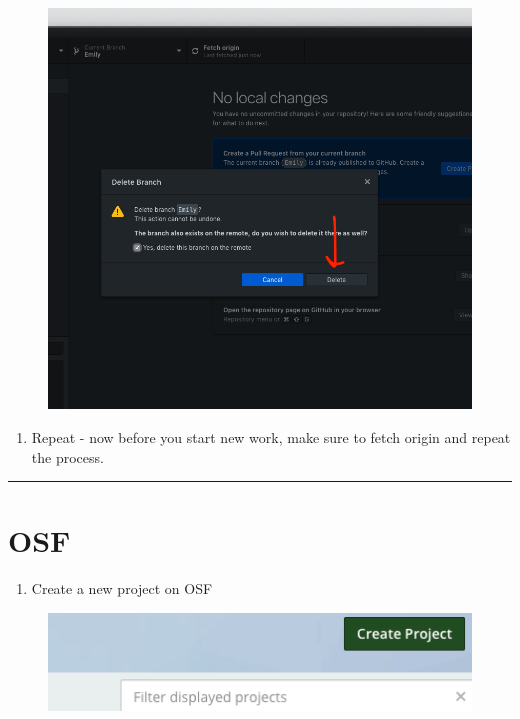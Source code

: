 \documentclass[]{book}
\providecommand{\tightlist}{%
  \setlength{\itemsep}{0pt}\setlength{\parskip}{0pt}}
\begin{document}
\begin{figure}
\centering
\includegraphics{images/research_protocols/github/31.png}
\caption{}
\end{figure}

\begin{enumerate}
\def\labelenumi{\arabic{enumi}.}
\setcounter{enumi}{9}
\tightlist
\item
  Repeat - now before you start new work, make sure to fetch origin and repeat the process.
\end{enumerate}

\begin{center}\rule{0.5\linewidth}{0.5pt}\end{center}

\hypertarget{osf}{%
\section{OSF}\label{osf}}

\begin{enumerate}
\def\labelenumi{\arabic{enumi}.}
\tightlist
\item
  Create a new project on OSF
\end{enumerate}

\begin{figure}
\centering
\includegraphics{images/research_protocols/osf/1.png}
\caption{}
\end{figure}
\end{document}
